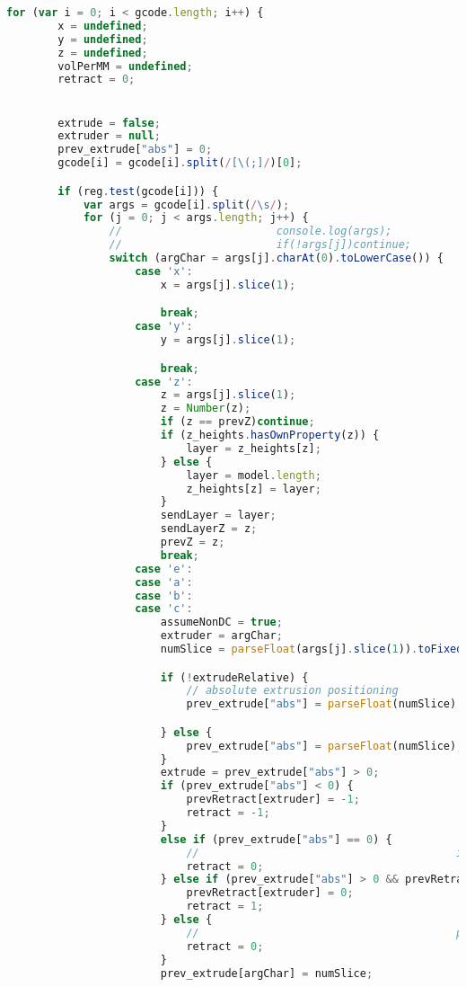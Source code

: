 \begin{lstlisting}[language=JavaScript, label={lst:Worker}, caption=Workerjs is the core gcode to D3 line processor.]
    for (var i = 0; i < gcode.length; i++) {
        x = undefined;
        y = undefined;
        z = undefined;
        volPerMM = undefined;
        retract = 0;


        extrude = false;
        extruder = null;
        prev_extrude["abs"] = 0;
        gcode[i] = gcode[i].split(/[\(;]/)[0];

        if (reg.test(gcode[i])) {
            var args = gcode[i].split(/\s/);
            for (j = 0; j < args.length; j++) {
                //                        console.log(args);
                //                        if(!args[j])continue;
                switch (argChar = args[j].charAt(0).toLowerCase()) {
                    case 'x':
                        x = args[j].slice(1);

                        break;
                    case 'y':
                        y = args[j].slice(1);

                        break;
                    case 'z':
                        z = args[j].slice(1);
                        z = Number(z);
                        if (z == prevZ)continue;
                        if (z_heights.hasOwnProperty(z)) {
                            layer = z_heights[z];
                        } else {
                            layer = model.length;
                            z_heights[z] = layer;
                        }
                        sendLayer = layer;
                        sendLayerZ = z;
                        prevZ = z;
                        break;
                    case 'e':
                    case 'a':
                    case 'b':
                    case 'c':
                        assumeNonDC = true;
                        extruder = argChar;
                        numSlice = parseFloat(args[j].slice(1)).toFixed(6);

                        if (!extrudeRelative) {
                            // absolute extrusion positioning
                            prev_extrude["abs"] = parseFloat(numSlice) - parseFloat(prev_extrude[argChar]);

                        } else {
                            prev_extrude["abs"] = parseFloat(numSlice);
                        }
                        extrude = prev_extrude["abs"] > 0;
                        if (prev_extrude["abs"] < 0) {
                            prevRetract[extruder] = -1;
                            retract = -1;
                        }
                        else if (prev_extrude["abs"] == 0) {
                            //                                        if(prevRetract <0 )prevRetract=retract;
                            retract = 0;
                        } else if (prev_extrude["abs"] > 0 && prevRetract[extruder] < 0) {
                            prevRetract[extruder] = 0;
                            retract = 1;
                        } else {
                            //                                        prevRetract = retract;
                            retract = 0;
                        }
                        prev_extrude[argChar] = numSlice;


\end{lstlisting}
